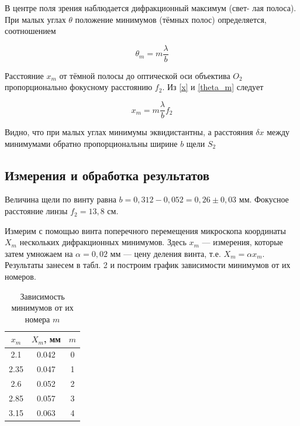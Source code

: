 \documentclass[12pt]{kiarticle}
\begin{document}
В центре поля зрения наблюдается дифракционный максимум (свет-
лая полоса). При малых углах $ \theta $ положение минимумов (тёмных полос)
определяется, соотношением

\begin{equation}\label{theta_m}
\theta_m = m \dfrac{\lambda}{b}
\end{equation}

Расстояние $ x_m $ от тёмной полосы до оптической оси объектива $ O_2 $ пропорционально фокусному расстоянию $ f_2 $. Из \eqref{x} и \eqref{theta_m} следует 

\begin{equation}\label{xm}
x_m = m \dfrac{\lambda}{b} f_2
\end{equation}

Видно, что при малых углах минимумы эквидистантны, а
расстояния $ \delta x $ между минимумами обратно пропорциональны ширине $ b $ щели $ S_2 $

\subsection{Измерения и обработка результатов}

Величина щели по винту равна $ b = 0,312 - 0,052 = 0,26 \pm 0,03 $ мм. Фокусное расстояние линзы $ f_2 = 13,8 $ см.

Измерим с помощью винта поперечного перемещения микроскопа координаты $ X_m $ нескольких дифракционных минимумов. Здесь $ x_m $ --- измерения, которые затем умножаем на $ \alpha = 0,02 $ мм --- цену деления винта, т.е. $ X_m = \alpha x_m $.
 Результаты занесем в табл. 2 и построим график зависимости минимумов от их номеров. 

\begin{table}[h!]
	\caption{Зависимость минимумов от их номера $ m $}
	\begin{center}
		\begin{tabular}{|c|c|c|}
			\hline
			$ x_m $ & $ X_m $, мм & $ m $ \\
			\hline
			 2.1 & 0.042 & 0 \\
			2.35 & 0.047 & 1 \\
			2.6 & 0.052 & 2 \\
			2.85 & 0.057 & 3 \\
			3.15 & 0.063 & 4 \\
			\hline
		\end{tabular}
	\end{center}
	\label{}
\end{table}
\end{document}
